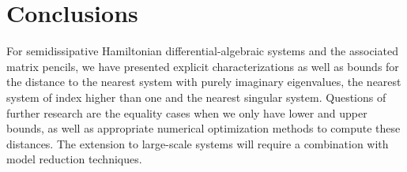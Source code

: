 \documentclass[11pt]{article}
\begin{document}

\section{Conclusions}\label{sec:conclusion}

For semidissipative Hamiltonian differential-algebraic systems and the associated matrix pencils, we have presented explicit characterizations as well as bounds for the distance to the nearest system with purely imaginary eigenvalues, the nearest system of index higher than one and the nearest  singular system. Questions of further research are  the equality cases when we only have lower and upper bounds, as well as  appropriate numerical optimization methods to compute these distances. The extension to large-scale systems will require a combination with model reduction techniques.


\end{document}
